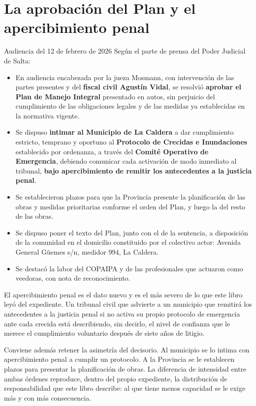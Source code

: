 \section{La aprobación del Plan y el apercibimiento penal}

\begin{ficha}{Audiencia del 12 de febrero de 2026}
Según el parte de prensa del Poder Judicial de Salta:
\begin{itemize}[leftmargin=*,nosep]
\item En audiencia encabezada por la jueza Mosmann, con intervención de las partes presentes y del \textbf{fiscal civil Agustín Vidal}, se resolvió \textbf{aprobar el Plan de Manejo Integral} presentado en autos, sin perjuicio del cumplimiento de las obligaciones legales y de las medidas ya establecidas en la normativa vigente.
\item Se dispuso \textbf{intimar al Municipio de La Caldera} a dar cumplimiento estricto, temprano y oportuno al \textbf{Protocolo de Crecidas e Inundaciones} establecido por ordenanza, a través del \textbf{Comité Operativo de Emergencia}, debiendo comunicar cada activación de modo inmediato al tribunal, \textbf{bajo apercibimiento de remitir los antecedentes a la justicia penal}.
\item Se establecieron plazos para que la Provincia presente la planificación de las obras y medidas prioritarias conforme el orden del Plan, y luego la del resto de las obras.
\item Se dispuso poner el texto del Plan, junto con el de la sentencia, a disposición de la comunidad en el domicilio constituido por el colectivo actor: Avenida General Güemes s/n, medidor 994, La Caldera.
\item Se destacó la labor del COPAIPA y de las profesionales que actuaron como veedoras, con nota de reconocimiento.
\end{itemize}
\end{ficha}

El apercibimiento penal es el dato nuevo y es el más severo de lo que este libro leyó del expediente. Un tribunal civil que advierte a un municipio que remitirá los antecedentes a la justicia penal si no activa su propio protocolo de emergencia ante cada crecida está describiendo, sin decirlo, el nivel de confianza que le merece el cumplimiento voluntario después de siete años de litigio.

Conviene además retener la asimetría del decisorio. Al municipio se lo intima con apercibimiento penal a cumplir un protocolo. A la Provincia se le establecen plazos para presentar la planificación de obras. La diferencia de intensidad entre ambas órdenes reproduce, dentro del propio expediente, la distribución de responsabilidad que este libro describe: al que tiene menos capacidad se le exige más y con más consecuencia.

